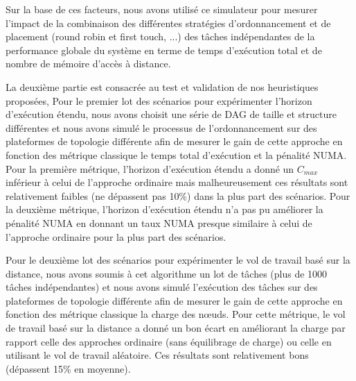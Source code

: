 Sur la base de ces facteurs, nous avons utilisé ce simulateur pour mesurer l'impact de la combinaison des différentes stratégies d'ordonnancement et de placement (round robin et first touch, ...) des tâches indépendantes de la performance globale du système en terme de temps d'exécution total et de nombre de mémoire d'accès à distance. 

La deuxième partie est consacrée au test et validation de nos heuristiques proposées, Pour le premier lot des scénarios pour expérimenter l'horizon d'exécution étendu, nous avons choisit une série de DAG de taille et structure différentes et nous avons simulé le processus de l'ordonnancement sur des plateformes de topologie différente afin de mesurer le gain de cette approche en fonction des métrique classique le temps total d'exécution et la pénalité NUMA. Pour la première métrique, l'horizon d'exécution étendu a donné un $C_{max}$ inférieur à celui de l'approche ordinaire mais malheureusement ces résultats sont relativement faibles (ne dépassent pas 10\%)  dans la plus part des scénarios. Pour la deuxième métrique, l'horizon d'exécution étendu n'a pas pu améliorer la pénalité NUMA en donnant un taux NUMA presque similaire à celui de l'approche ordinaire pour la plus part des scénarios.

Pour le deuxième lot des scénarios pour expérimenter le vol de travail basé sur la distance, nous avons soumis à cet algorithme un lot de tâches (plus de 1000 tâches indépendantes) et nous avons simulé l'exécution des tâches sur des plateformes de topologie différente afin de mesurer le gain de cette approche en fonction des métrique classique la charge des nœuds. Pour cette métrique, le vol de travail basé sur la distance a donné un bon écart en améliorant la charge par rapport celle  des approches ordinaire (sans équilibrage de charge) ou celle en utilisant le vol de travail aléatoire. Ces résultats sont relativement bons (dépassent 15\% en moyenne).

